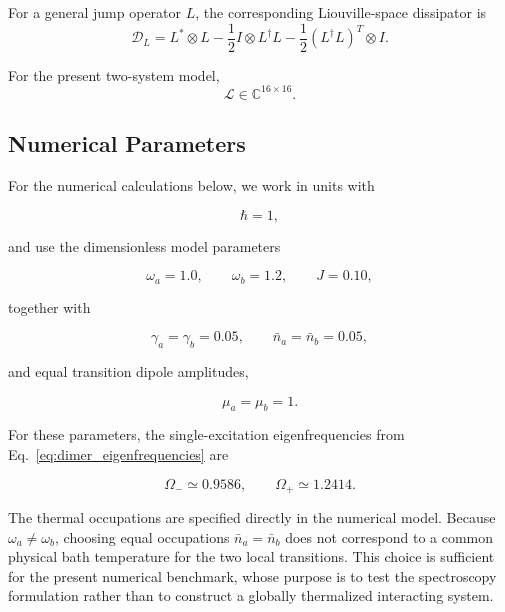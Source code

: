 \documentclass[11pt]{article}
\begin{document}
For a general jump operator $L$, the corresponding Liouville-space
dissipator is
%
\begin{equation}
\mathcal{D}_L
=
L^*\otimes L
-
\frac{1}{2}
I\otimes L^\dagger L
-
\frac{1}{2}
\left(
L^\dagger L
\right)^T
\otimes I.
\end{equation}

For the present two-system model,
%
\begin{equation}
\mathcal{L}
\in
\mathbb{C}^{16\times16}.
\end{equation}

\subsection{Numerical Parameters}
\label{subsec:dimer_parameters}

For the numerical calculations below, we work in units with

\begin{equation}
\hbar=1,
\end{equation}

and use the dimensionless model parameters

\begin{equation}
\boxed{
\omega_a=1.0,
\qquad
\omega_b=1.2,
\qquad
J=0.10,
}
\end{equation}

together with

\begin{equation}
\boxed{
\gamma_a=\gamma_b=0.05,
\qquad
\bar n_a=\bar n_b=0.05,
}
\end{equation}

and equal transition dipole amplitudes,

\begin{equation}
\boxed{
\mu_a=\mu_b=1.
}
\end{equation}

For these parameters, the single-excitation eigenfrequencies from
Eq.~\eqref{eq:dimer_eigenfrequencies} are

\begin{equation}
\boxed{
\Omega_-
\simeq
0.9586,
\qquad
\Omega_+
\simeq
1.2414.
}
\end{equation}

The thermal occupations are specified directly in the numerical model.
Because $\omega_a\neq\omega_b$, choosing equal occupations
$\bar n_a=\bar n_b$ does not correspond to a common physical bath
temperature for the two local transitions. This choice is sufficient
for the present numerical benchmark, whose purpose is to test the
spectroscopy formulation rather than to construct a globally
thermalized interacting system.
\end{document}
